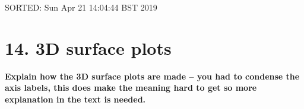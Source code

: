 \documentclass[12pt]{article}
\begin{document}
SORTED:   Sun Apr 21 14:04:44 BST 2019


\section*{14. 3D surface plots}
\textbf{
Explain how the 3D surface plots are made --
you had to condense the axis labels, this 
does make the meaning hard to get 
so more explanation in the text is needed.
}


%
%
%
\end{document}
